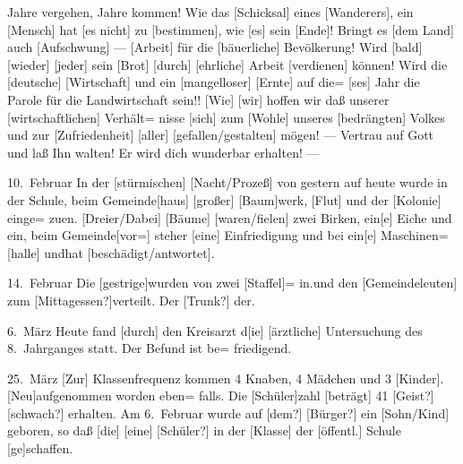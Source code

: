 

\pstart
Jahre vergehen, Jahre kommen! Wie das {[Schicksal]} eines\ob
{[Wanderers]}, ein {[Mensch]} hat [es nicht] zu {[bestimmen]}, wie {[es]} sein {[Ende]}! Bringt es [dem Land] auch\unsicher{} {[Aufschwung]} — {[Arbeit]} für die\ob
{[bäuerliche]} Bevölkerung! Wird {[bald]} {[wieder]} {[jeder]} sein\ob
{[Brot]} {[durch]} {[ehrliche]} Arbeit {[verdienen]} können! Wird die {[deutsche]}\ob
{[Wirtschaft]} und ein {[mangelloser]}\unsicher{} {[Ernte]} auf die=\ob
{[ses]} Jahr\unsicher{} die Parole für die Landwirtschaft sein!! {[Wie]}\ob
{[wir]} hoffen wir daß\unsicher{} unserer {[wirtschaftlichen]} Verhält=\ob
nisse {[sich]}\unsicher{} zum {[Wohle]} unseres {[bedrängten]} Volkes und zur\ob
{[Zufriedenheit]} {[aller]} [gefallen/gestalten] mögen!\ob
— Vertrau auf Gott und laß Ihn walten!\ob
Er wird dich wunderbar erhalten! —

10.\ Februar   In der {[stürmischen]} [Nacht/Prozeß] von gestern auf\ob
heute wurde in der Schule, beim Gemeinde{[haus]}\unsicher{} {[großer]}\ob
{[Baum]}werk, {[Flut]} und der\unsicher{} {[Kolonie]} einge=\ob
\unsicher zu\unsicher{}en. [Dreier/Dabei] {[Bäume]} [waren/fielen] zwei Birken,\ob
ein{[e]} Eiche und ein\unsicher, beim Gemeinde[vor=]\ob
steher {[eine]} Einfriedigung und bei\unsicher{} ein{[e]} Maschinen=\ob
{[halle]} und\unsicher{}\unsicher hat [beschädigt/antwortet].

14.\ Februar   Die {[gestrige]}\unsicher{}\unsicher wurden von zwei {[Staffel]}=\ob
{} in\unsicher.\unsicher{}\unsicher und den\ob
{[Gemeindeleuten]} zum [Mittagessen?]\unsicher{}verteilt. Der [Trunk?] der\unsicher{}.

6.\ März       Heute fand {[durch]} den Kreisarzt\unsicher{} d{[ie]} {[ärztliche]}\ob
Untersuchung des 8.\ Jahrganges statt. Der Befund ist be=\ob
friedigend.

25.\ März      {[Zur]} Klassenfrequenz kommen 4 Knaben, 4 Mädchen\ob
und 3 {[Kinder]}. {[Neu]}aufgenommen worden eben=\ob
falls\unsicher. Die {[Schüler]}zahl {[beträgt]} 41 [Geist?] [schwach?] erhalten.\ob
Am 6.\ Februar wurde auf [dem?]\unsicher{} [Bürger?] ein [Sohn/Kind]\ob
geboren\unsicher, so daß {[die]} {[eine]}\unsicher{} [Schüler?]\unsicher\ob
in der {[Klasse]} der [öffentl.] Schule {[ge]}schaffen\unsicher.
\pend
